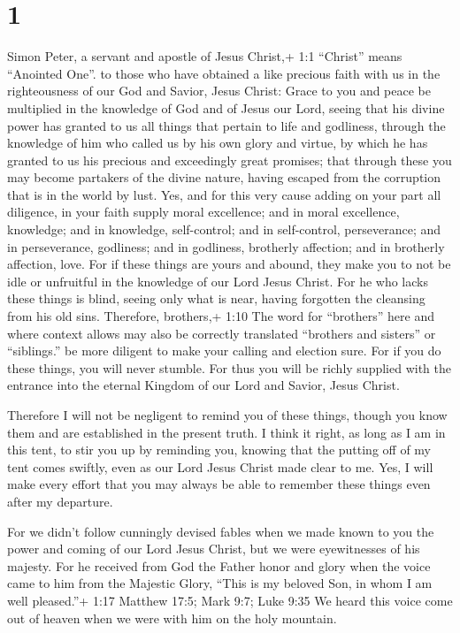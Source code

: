\hypertarget{section}{%
\section{1}\label{section}}

 Simon Peter, a servant and apostle of Jesus Christ,+ 1:1
``Christ'' means ``Anointed One''. to those who have obtained a like
precious faith with us in the righteousness of our God and Savior, Jesus
Christ:  Grace to you and peace be multiplied in the
knowledge of God and of Jesus our Lord,  seeing that his
divine power has granted to us all things that pertain to life and
godliness, through the knowledge of him who called us by his own glory
and virtue,  by which he has granted to us his precious and
exceedingly great promises; that through these you may become partakers
of the divine nature, having escaped from the corruption that is in the
world by lust.  Yes, and for this very cause adding on your
part all diligence, in your faith supply moral excellence; and in moral
excellence, knowledge;  and in knowledge, self-control; and
in self-control, perseverance; and in perseverance, godliness;
 and in godliness, brotherly affection; and in brotherly
affection, love.  For if these things are yours and abound,
they make you to not be idle or unfruitful in the knowledge of our Lord
Jesus Christ.  For he who lacks these things is blind,
seeing only what is near, having forgotten the cleansing from his old
sins.  Therefore, brothers,+ 1:10 The word for ``brothers''
here and where context allows may also be correctly translated
``brothers and sisters'' or ``siblings.'' be more diligent to make your
calling and election sure. For if you do these things, you will never
stumble.  For thus you will be richly supplied with the
entrance into the eternal Kingdom of our Lord and Savior, Jesus Christ.

 Therefore I will not be negligent to remind you of these
things, though you know them and are established in the present truth.
 I think it right, as long as I am in this tent, to stir
you up by reminding you,  knowing that the putting off of
my tent comes swiftly, even as our Lord Jesus Christ made clear to me.
 Yes, I will make every effort that you may always be able
to remember these things even after my departure.

 For we didn't follow cunningly devised fables when we made
known to you the power and coming of our Lord Jesus Christ, but we were
eyewitnesses of his majesty.  For he received from God the
Father honor and glory when the voice came to him from the Majestic
Glory, ``This is my beloved Son, in whom I am well pleased.''+ 1:17
Matthew 17:5; Mark 9:7; Luke 9:35  We heard this voice come
out of heaven when we were with him on the holy mountain.


